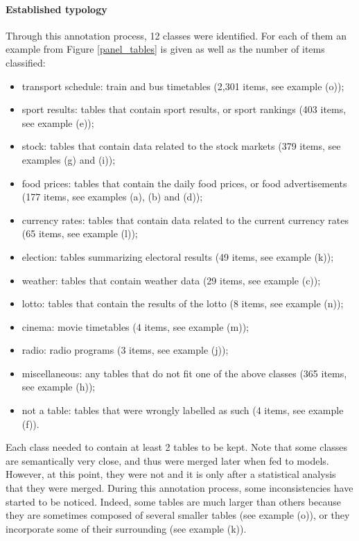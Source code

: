 \paragraph{Established typology}
Through this annotation process, 12 classes were identified. For each of them an example from Figure \ref{panel_tables} is given as well as the number of items classified:
\begin{itemize}
\setlength\itemsep{0em}
\item transport schedule: train and bus timetables (2,301 items, see example (o));
\item sport results: tables that contain sport results, or sport rankings (403 items, see example (e));
\item stock: tables that contain data related to the stock markets (379 items, see examples (g) and (i));
\item food prices: tables that contain the daily food prices, or food advertisements (177 items, see examples (a), (b) and (d));
\item currency rates: tables that contain data related to the current currency rates (65 items, see example (l));
\item election: tables summarizing electoral results (49 items, see example (k));
\item weather: tables that contain weather data (29 items, see example (c));
\item lotto: tables that contain the results of the lotto (8 items, see example (n));
\item cinema: movie timetables (4 items, see example (m));
\item radio: radio programs (3 items, see example (j));
\item miscellaneous: any tables that do not fit one of the above classes (365 items, see example (h));
\item not a table: tables that were wrongly labelled as such (4 items, see example (f)).
\end{itemize}
Each class needed to contain at least 2 tables to be kept. Note that some classes are semantically very close, and thus were merged later when fed to models. However, at this point, they were not and it is only after a statistical analysis that they were merged. During this annotation process, some inconsistencies have started to be noticed. Indeed, some tables are much larger than others because they are sometimes composed of several smaller tables (see example (o)), or they incorporate some of their surrounding (see example (k)).

